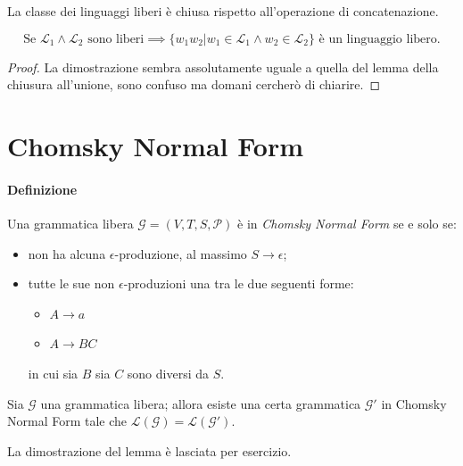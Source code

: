 \documentclass[class=book, crop=false, oneside, 12pt]{standalone}
\begin{document}
\begin{lemma}
  La classe dei linguaggi liberi è chiusa rispetto all'operazione di concatenazione.

  \begin{equation*}
    \textrm{Se } \mathcal{L}_1 \land \mathcal{L}_2 \textrm{ sono liberi} \implies \{w_1w_2 | w_1 \in \mathcal{L}_1 \land w_2 \in \mathcal{L}_2\} \textrm{ è un linguaggio libero.}
  \end{equation*}

\end{lemma}

\begin{proof}
  La dimostrazione sembra assolutamente uguale a quella del lemma della chiusura all'unione, sono confuso ma domani cercherò di chiarire.
\end{proof}


\section{Chomsky Normal Form}
\paragraph{Definizione}
Una grammatica libera \(\mathcal{G} = (V, T, S, \mathcal{P})\) è in \emph{Chomsky Normal Form} se e solo se:
\begin{itemize}
  \item non ha alcuna \(\epsilon\)-produzione, al massimo \(S \rightarrow \epsilon\);
  \item tutte le sue non \(\epsilon\)-produzioni  una tra le due seguenti forme:
  \begin{itemize}
    \item \(A \rightarrow a\)
    \item \(A \rightarrow BC\)
  \end{itemize}
  in cui sia \(B\) sia \(C\) sono diversi da \(S\).
\end{itemize}

\begin{lemma}
  Sia \(\mathcal{G}\) una grammatica libera; allora esiste una certa grammatica \(\mathcal{G'}\) in Chomsky Normal Form tale che \(\mathcal{L(G)} = \mathcal{L(G')}\).
\end{lemma}

\noindent La dimostrazione del lemma è lasciata per esercizio.
\end{document}
